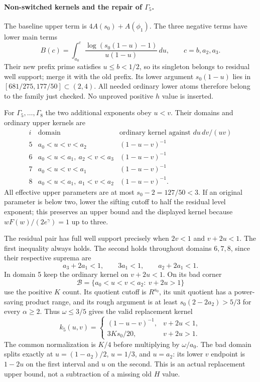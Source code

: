 \paragraph{Non-switched kernels and the repair of $\Gamma_5$.}
The baseline upper term is $4A(s_0)+A(\phi_1)$.
The three negative terms have lower main terms
\[
 B(c)=\int_{a_0}^{c}
 \frac{\log(s_0(1-u)-1)}{u(1-u)}\,du,
 \qquad c=b,a_2,a_3.
\]
Their new prefix prime satisfies $u\le b<1/2$, so its singleton
belongs to residual well support; merge it with the old prefix.
Its lower argument $s_0(1-u)$ lies in $[681/275,177/50]\subset(2,4)$.
All needed ordinary lower atoms therefore belong to the family just
checked.  No unproved positive $h$ value is inserted.

For $\Gamma_5,\ldots,\Gamma_8$ the two additional exponents obey
$u<v$.  Their domains and ordinary upper kernels are
\[
\begin{array}{c|c|c}
i&\text{domain}&\text{ordinary kernel against }du\,dv/(uv)\\\hline
5&a_0<u<v<a_2&(1-u-v)^{-1}\\
6&a_0<u<a_1,\ a_2<v<a_3&(1-u-v)^{-1}\\
7&a_0<u<v<a_1&(1-u-v)^{-1}\\
8&a_0<u<a_1,\ a_1<v<a_2&(1-u-v)^{-1}.
\end{array}
\]
All effective upper parameters are at most $s_0-2=127/50<3$.
If an original parameter is below two, lower the sifting cutoff to
half the residual level exponent; this preserves an upper bound and
the displayed kernel because $wF(w)/(2e^\gamma)=1$ up to three.

The residual pair has full well support precisely when
$2v<1$ and $v+2u<1$.  The first inequality always holds.  The second
holds throughout domains $6,7,8$, since their respective suprema are
\[
 a_3+2a_1<1,\qquad3a_1<1,\qquad a_2+2a_1<1.
\]
In domain 5 keep the ordinary kernel on $v+2u<1$.
On its bad corner
\[
 \mathcal B=\{a_0<u<v<a_2:\ v+2u>1\}
\]
use the positive $K$ count.  Its quotient cutoff is $R^{a_0}$,
its unit quotient has a power-saving product range, and its rough
argument is at least $s_0(2-2a_2)>5/3$ for every $\alpha\ge2$.
Thus $\omega\le3/5$ gives the valid replacement kernel
\begin{equation}\label{eq:second-seed-kernel}
 k_5(u,v)=
 \begin{cases}
 (1-u-v)^{-1},&v+2u<1,\\
 3Ks_0/20,&v+2u>1.
 \end{cases}
\end{equation}
The common normalization is $K/4$ before multiplying by $\omega/a_0$.
The bad domain splits exactly at
$u=(1-a_2)/2$, $u=1/3$, and $u=a_2$: its lower $v$ endpoint is
$1-2u$ on the first interval and $u$ on the second.
This is an actual replacement upper bound, not a subtraction of a
missing old $H$ value.


